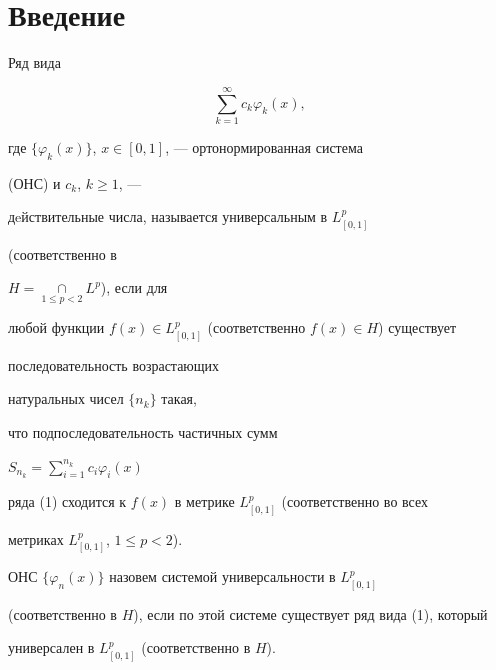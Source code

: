  


\section{Введение} 


 


\begin{defn} 


Ряд вида 


\begin{equation} 


\sum^\infty_{k=1}c_k\varphi_k(x), 


\end{equation} 


где $\{\varphi_k(x)\}$, $x\in[0,1]$, --- ортонормированная система 


(ОНС) и $c_k$, $k\ge1$, --- 


дeйствительные числа, называется универсальным в $L^p_{[0,1]}$


(соответственно в 


$H=\mathop{\cap}\limits_{1\le p<2}L^p$), если для 


любой функции $f(x)\in L^p_{[0,1]}$ (соответственно $f(x)\in H$) существует 


последовательность возрастающих 


натуральных чисел $\{n_k\}$ такая, 


что подпоследовательность частичных сумм 


$S_{n_k}=\sum\limits^{n_k}_{i=1}c_i\varphi_i(x)$ 


ряда (1) сходится к $f(x)$ в метрике $L^p_{[0,1]}$ (соответственно во всех 


метриках $L^p_{[0,1]}$, $1\le p<2$). 


\end{defn} 


 


\begin{defn} 


ОНС $\{\varphi_n(x)\}$ назовем системой универсальности в $L^p_{[0,1]}$ 


(соответственно в $H$), если по этой системе существует ряд вида (1), который 


универсален в $L^p_{[0,1]}$ (соответственно в $H$). 


\end{defn} 


 



